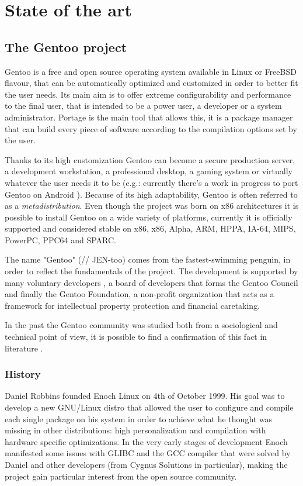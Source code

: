 \chapter{State of the art}

\section{The Gentoo project}
Gentoo is a free and open source operating system available in Linux or FreeBSD flavour, that can be automatically optimized and customized in order to better fit the user needs. Its main aim is to offer extreme configurability and performance to the final user, that is intended to be a power user, a developer or a system administrator. Portage is the main tool that allows this, it is a package manager that can build every piece of software according to the compilation options set by the user.

Thanks to its high customization Gentoo can become a secure production server, a development workstation, a professional desktop, a gaming system or virtually whatever the user needs it to be (e.g.: currently there's a work in progress to port Gentoo on Android \cite{gentoo_android}). Because of its high adaptability, Gentoo is often referred to as a \emph{metadistribution}.
Even though the project was born on x86 architectures it is possible to install Gentoo on a wide variety of platforms, currently it is officially supported and considered stable on x86, x86, Alpha, ARM, HPPA, IA-64, MIPS, PowerPC, PPC64 and SPARC.

The name "Gentoo" (// JEN-too) comes from the fastest-swimming penguin, in order to reflect the fundamentals of the project.
The development is supported by many voluntary developers \cite{gentoo_developers}, a board of developers that forms the Gentoo Council and finally the Gentoo Foundation, a non-profit organization that acts as a framework for intellectual property protection and financial caretaking.

In the past the Gentoo community was studied both from a sociological and technical point of view, it is possible to find a confirmation of this fact in literature \cite{gentoo_book} \cite{gentoo_rise} \cite{gentoo_distributed} \cite{gentoo_ng}.


\subsection{History}
Daniel Robbins founded Enoch Linux on 4th of October 1999. His goal was to develop a new GNU/Linux distro that allowed the user to configure and compile each single package on his system in order to achieve what he thought was missing in other distributions: high personalization and compilation with hardware specific optimizations.
In the very early stages of development Enoch manifested some issues with GLIBC and the GCC compiler that were solved by Daniel and other developers (from Cygnus Solutions in particular), making the project gain particular interest from the open source community.

